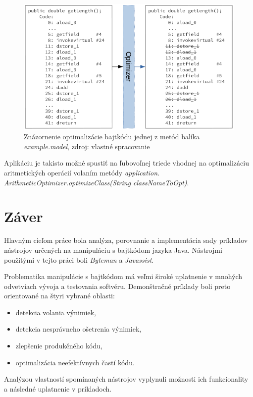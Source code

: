 \documentclass[11pt,final,oneside]{fithesis}
\begin{document}
\begin{figure}[h]
  \centering
   \includegraphics[width=\textwidth]{optimizer.png}
  \caption{Znázornenie optimalizácie bajtkódu jednej z metód balíka
  \textit{example.model}, zdroj: vlastné spracovanie}
  \label{fig:opt}
\end{figure}

Aplikáciu je takisto možné spustiť na ľubovoľnej triede vhodnej na 
optimalizáciu aritmetických operácií volaním metódy \textit{application.
ArithmeticOptimizer.optimizeClass(String classNameToOpt)}.

\chapter{Záver}

Hlavným cieľom práce bola analýza, porovnanie a implementácia sady príkladov
nástrojov určených na manipuláciu s bajtkódom jazyka Java. Nástrojmi použitými
v tejto práci boli \textit{Byteman} a \textit{Javassist}. 

Problematika manipulácie s bajtkódom má veľmi široké uplatnenie v mnohých
odvetviach vývoja a testovania softvéru. Demonštračné príklady boli preto
orientované na štyri vybrané oblasti:

\begin{itemize}
\item detekcia volania výnimiek,
\item detekcia nesprávneho ošetrenia výnimiek,
\item zlepšenie produkčného kódu,
\item optimalizácia neefektívnych častí kódu.
\end{itemize}

Analýzou vlastností spomínaných nástrojov vyplynuli možnosti ich funkcionality
a následné uplatnenie v príkladoch. 
\end{document}
